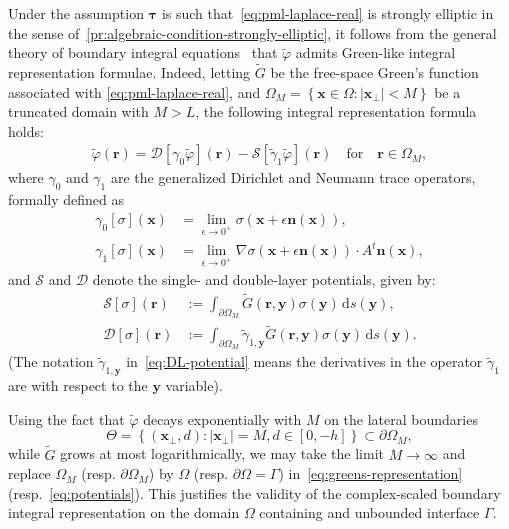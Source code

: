 \documentclass[11pt]{article}
\newcommand{\bn}{\mathbf{n}}
\newcommand{\bx}{\mathbf{x}}
\newcommand{\btau}{\mathbf{\tau}}
\newcommand{\by}{\mathbf{y}}
\newcommand{\br}{\boldsymbol{r}}
\newcommand{\de}{\,\mathrm{d}}
\newcommand{\tvarphi}{\tilde \varphi}
\begin{document}
Under the assumption $\btau$ is such that~\cref{eq:pml-laplace-real} is strongly
elliptic in the sense of~\cref{pr:algebraic-condition-strongly-elliptic}, it
follows from the general theory of boundary integral
equations~\cite{mclean2000strongly} that $\tvarphi$ admits Green-like integral
representation formulae. Indeed, letting $\tilde{G}$ be the free-space Green's
function associated with \cref{eq:pml-laplace-real}, and $\Omega_M = \left\{\bx
\in \Omega : |\bx_{\perp}| <  M \right\}$ be a truncated domain with $M>L$, the
following integral representation formula holds:
\begin{align}
  \label{eq:greens-representation}
  \tvarphi(\br) = \mathcal{D}[\gamma_0\tvarphi](\br) - \mathcal{S}[\tilde{\gamma}_1 {\tvarphi}](\br) \quad \mbox{for} \quad \br \in \Omega_M,
\end{align}
where $\gamma_0$ and $\gamma_1$ are the generalized Dirichlet and Neumann trace
operators, formally defined as 
\begin{subequations}
\label{eq:traces}  
\begin{align}
  \label{eq:dir-trace}
  \gamma_0[\sigma](\bx) &= \lim_{\epsilon \to 0^+} \sigma(\bx + \epsilon \bn(\bx)),\\
  \label{eq:neu-trace}
  \gamma_1[\sigma](\bx) &= \lim_{\epsilon \to 0^+} \nabla \sigma(\bx + \epsilon \bn(\bx)) \cdot A^t \bn(\bx),
\end{align}
\end{subequations}
and $\mathcal{S}$ and $\mathcal{D}$ denote the single- and double-layer
potentials, given by:
\begin{subequations}\label{eq:potentials}
  \begin{align}
    \label{eq:SL-potential}  
    \mathcal{S}[\sigma](\br) &:= \int_{\partial \Omega_M} {\tilde{G}}(\br, \by)\sigma(\by) \de s(\by), \\
    \label{eq:DL-potential}  
    \mathcal{D}[\sigma](\br) &:= \int_{\partial \Omega_M} \tilde{\gamma}_{1,\by}{\tilde{G}}(\br, \by) \sigma(\by) \de s(\by).
  \end{align}
\end{subequations}
(The notation $\tilde{\gamma}_{1,\by}$ in~\eqref{eq:DL-potential} means the
derivatives in the operator $\tilde{\gamma}_1$ are with respect to the $\by$
variable). 

Using the fact that $\tvarphi$ decays exponentially with $M$ on the lateral
boundaries $$\Theta = \left\{ (\bx_\perp, d) : |\bx_\perp| = M, d \in [0,-h]
\right\} \subset \partial\Omega_M,$$ while $\tilde{G}$ grows at most
logarithmically, we may take the limit $M \to \infty$ and replace $\Omega_M$
(resp. $\partial \Omega_M$) by $\Omega$ (resp. $\partial \Omega = \Gamma$)
in~\cref{eq:greens-representation} (resp.~\cref{eq:potentials}). This justifies
the validity of the complex-scaled boundary integral representation on the
domain $\Omega$ containing and unbounded interface $\Gamma$. 
\end{document}
